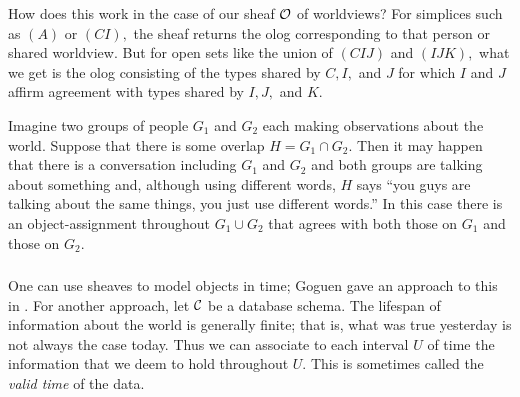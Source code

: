 \documentclass[CT4S-EN-RU]{subfiles}
\begin{document}
\begin{blockRUS}
\end{blockRUS}

\begin{blockENG}
How does this work in the case of our sheaf $\mathcal{O}$ of worldviews? For simplices such as $(A)$ or $(CI),$ the sheaf returns the olog corresponding to that person or shared worldview. But for open sets like the union of $(CIJ)$ and $(IJK),$ what we get is the olog consisting of the types shared by $C, I,$ and $J$ for which $I$ and $J$ affirm agreement with types shared by $I, J,$ and $K.$
\end{blockENG}

\begin{blockRUS}
\end{blockRUS}

\begin{exampleENG}
Imagine two groups of people $G_1$ and $G_2$ each making observations about the world. Suppose that there is some overlap $H=G_1\cap G_2.$ Then it may happen that there is a conversation including $G_1$ and $G_2$ and both groups are talking about something and, although using different words, $H$ says “you guys are talking about the same things, you just use different words.” In this case there is an object-assignment throughout $G_1\cup G_2$ that agrees with both those on $G_1$ and those on $G_2.$
\end{exampleENG}

\begin{exampleRUS}
\end{exampleRUS}


\subsubsection{}

\begin{blockENG}
One can use sheaves to model objects in time; Goguen gave an approach to this in \cite{Gog}. For another approach, let $\mathcal{C}$ be a database schema. The lifespan of information about the world is generally finite; that is, what was true yesterday is not always the case today. Thus we can associate to each interval $U$ of time the information that we deem to hold throughout $U.$ This is sometimes called the {\em valid time} of the data.
\end{blockENG}
\end{document}
